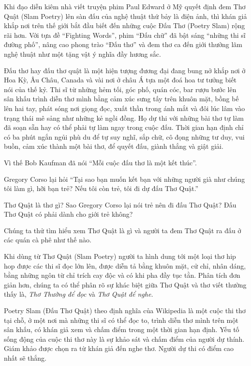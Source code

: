 \documentclass[../main.tex]{subfiles}
\begin{document}
\begin{multicols}{2}
Khi đạo diễn kiêm nhà viết truyện phim Paul Edward ở Mỹ quyết định đem Thơ Quật (Slam Poetry) lên sàn đấu của nghệ thuật thứ bảy là điện ảnh, thì khán giả khắp nơi trên thế giới bắt đầu biết đến những cuộc Đấu Thơ (Poetry Slam) rộng rãi hơn. Với tựa đề “Fighting Words”, phim “Đấu chữ” đã bật sáng “những thi sĩ đường phố”, nâng cao phong trào “Đấu thơ” và đem thơ ca đến giới thưởng lãm nghệ thuật như một tặng vật ý nghĩa đầy hương sắc.  
 
Đấu thơ hay đấu thơ quật là một hiện tượng đương đại đang bung nở khắp nơi ở Hoa Kỳ, Âu Châu, Canada và vài nơi ở châu Á tựa một đoá hoa tư tưởng biết nói của thế kỷ. Thi sĩ từ những hẻm tối, góc phố, quán cóc, bar rượu bước lên sân khấu trình diễn thơ mình bằng cảm xúc sưng tấy trên khuôn mặt, bồng bế lên hai tay, phát sóng nơi giọng đọc, xuất thần trong ánh mắt và đôi lúc lâm vào trạng thái mê sảng như những kẻ ngồi đồng. Họ dự thi với những bài thơ tự làm đã soạn sẵn hay có thể phải tự làm ngay trong cuộc đấu. Thời gian hạn định chỉ có ba phút ngắn ngủi phù du để tự suy nghĩ, sắp chữ, cô đọng những tư duy, vui buồn, cảm xúc thành một bài thơ, để quyết đấu, giành thắng và giật giải.  
 
Vì thế Bob Kaufman đã nói “Mỗi cuộc đấu thơ là một kết thúc”.   
 
Gregory Corso lại hỏi “Tại sao bạn muốn kết bạn với những người già như chúng tôi làm gì, hỡi bạn trẻ? Nếu tôi còn trẻ, tôi đi dự đấu Thơ Quật.”  
 
Thơ Quật là thơ gì? Sao Gregory Corso lại nói trẻ nên đi đấu Thơ Quật? Đấu Thơ Quật có phải dành cho giới trẻ không? 
 
Chúng ta thử tìm hiểu xem Thơ Quật là gì và người ta đem Thơ Quật ra đấu ở các quán cà phê như thế nào. 
 
Khi dùng từ Thơ Quật (Slam Poetry) người ta hình dung tới một loại thơ hip hop được các thi sĩ đọc lớn lên, được diễn tả bằng khuôn mặt, cử chỉ, nhân dáng, bằng những ngôn từ chỉ trích cay độc và có khi pha đầy tục tằn. Phân tích đơn giản hơn, chúng ta có thể phân rõ sự khác biệt giữa Thơ Quật và thơ viết thường thấy là, \textit{Thơ Thường để đọc} và \textit{Thơ Quật để nghe. } 
 
Poetry Slam (Đấu Thơ Quật) theo định nghĩa của Wikipedia là một cuộc thi thơ tại chỗ, ở một nơi mà những thi sĩ có thể đọc to, trình diễn thơ mình trên một sân khấu, có khán giả xem và chấm điểm trong một thời gian hạn định. Yếu tố sống động của cuộc thi thơ này là sự khảo sát và chấm điểm của người dự thính. Giám khảo được chọn ra từ khán giả đến nghe thơ. Người dự thi có điểm cao nhất sẽ thắng. 
 

\end{multicols}
\end{document}
